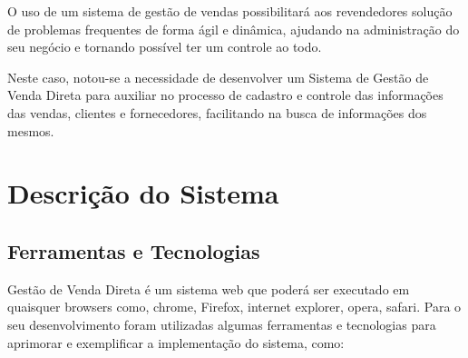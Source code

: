 \documentclass[chapter=TITLE,12pt,oneside,a4paper,english,french,sumario=tradicional,spanish,brazil,]{abntex2}
\begin{document}
O uso de um sistema de gestão de vendas possibilitará aos revendedores solução de problemas frequentes de forma ágil e dinâmica, ajudando na administração do seu negócio e tornando possível ter um controle ao todo.

Neste caso, notou-se a necessidade de desenvolver um Sistema de Gestão de Venda Direta para auxiliar no processo de cadastro e controle das informações das vendas, clientes e fornecedores, facilitando na busca de informações dos mesmos.


\chapter{Descrição do Sistema}
\section{Ferramentas e Tecnologias}
Gestão de Venda Direta é um sistema web que poderá ser executado em quaisquer browsers como, chrome, Firefox, internet explorer, opera, safari.
Para o seu desenvolvimento foram utilizadas algumas ferramentas e tecnologias para aprimorar e exemplificar a implementação do sistema, como:
\end{document}
